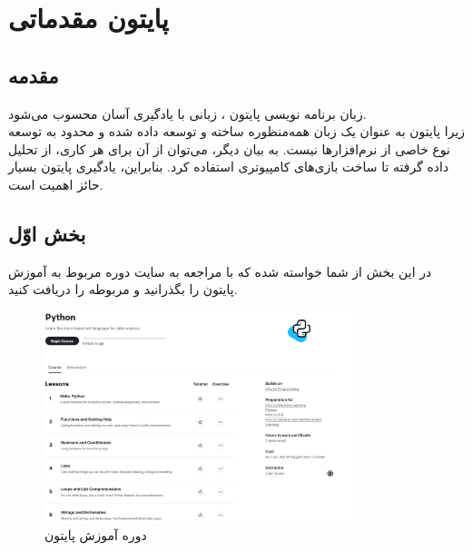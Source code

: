 \documentclass{article}
\begin{document}


\newpage
\section{پایتون مقدماتی}
\subsection{مقدمه}
زبان برنامه نویسی پایتون ، زبانی با یادگیری آسان محسوب می‌شود. \\زیرا پایتون به عنوان یک زبان همه‌منظوره  ساخته و توسعه داده شده و محدود به توسعه نوع خاصی از نرم‌افزارها نیست. به بیان دیگر، می‌توان از آن برای هر کاری، از تحلیل داده  گرفته تا ساخت بازی‌های کامپیوتری استفاده کرد. بنابراین، یادگیری پایتون بسیار حائز اهمیت است.

\subsection{بخش اوّل}
در این بخش از شما خواسته شده که با مراجعه به سایت  دوره مربوط به آموزش پایتون را بگذرانید و  مربوطه را دریافت کنید.\\

\begin{figure}[ht]
    \centering
    \includegraphics[width=0.8\textwidth]{./figures/kaggle_python.jpeg}
    \caption{دوره آموزش پایتون}
    \label{fig:fig1}
\end{figure}

\newpage
\end{document}
